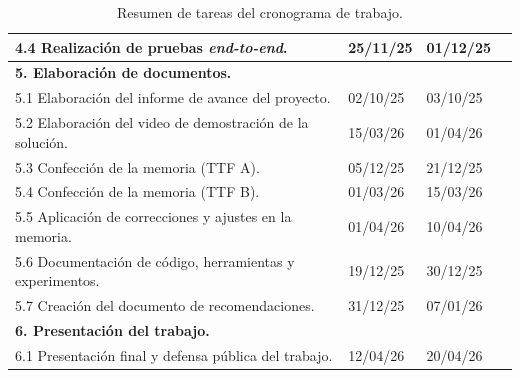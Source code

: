 \documentclass[
11pt, %
]{charter}
\begin{document}
\begin{table}[ht]
\begin{tabularx}{\linewidth}{@{}|l|X|X|l|@{}}
		4.4 Realización de pruebas \textit{end-to-end}. & 25/11/25 & 01/12/25 \\ \hline
		\multicolumn{3}{|l|}{\textbf{5. Elaboración de documentos.}} \\ \hline
		5.1 Elaboración del informe de avance del proyecto. & 02/10/25 & 03/10/25 \\ \hline
		5.2 Elaboración del video de demostración de la solución. & 15/03/26 & 01/04/26 \\ \hline
		5.3 Confección de la memoria (TTF A). & 05/12/25 & 21/12/25 \\ \hline
		5.4 Confección de la memoria (TTF B). & 01/03/26 & 15/03/26 \\ \hline
		5.5 Aplicación de correcciones y ajustes en la memoria. & 01/04/26 & 10/04/26 \\ \hline
		5.6 Documentación de código, herramientas y experimentos. & 19/12/25 & 30/12/25 \\ \hline
		5.7 Creación del documento de recomendaciones. & 31/12/25 & 07/01/26 \\ \hline
		\multicolumn{3}{|l|}{\textbf{6. Presentación del trabajo.}} \\ \hline
		6.1 Presentación final y defensa pública del trabajo. & 12/04/26 & 20/04/26 \\ \hline
	\end{tabularx}
	\caption{Resumen de tareas del cronograma de trabajo.}
	\label{tab:wbs}
\end{table}
\end{document}
